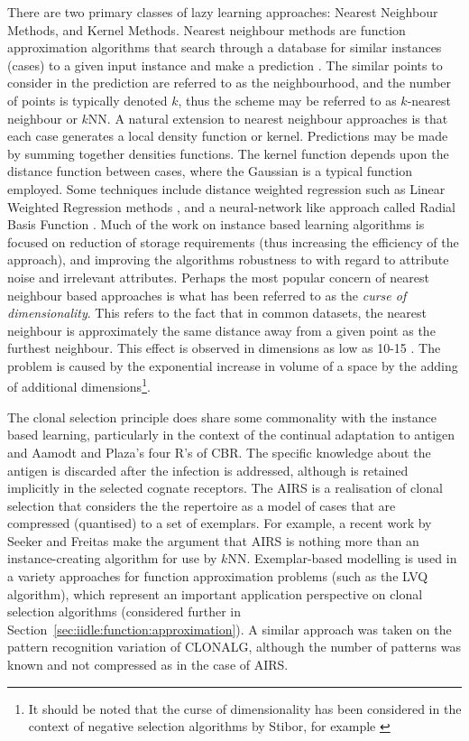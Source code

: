 There are two primary classes of lazy learning approaches: Nearest Neighbour Methods, and Kernel Methods. Nearest neighbour methods are function approximation algorithms that search through a database for similar instances (cases) to a given input instance and make a prediction \cite{Cover1967}.  The similar points to consider in the prediction are referred to as the neighbourhood, and the number of points is typically denoted $k$, thus the scheme may be referred to as $k$-nearest neighbour or $k$NN. A natural extension to nearest neighbour approaches is that each case generates a local density function or kernel. Predictions may be made by summing together densities functions. The kernel function depends upon the distance function between cases, where the Gaussian is a typical function employed. Some techniques include distance weighted regression such as Linear Weighted Regression methods \cite{Atkeson1997}, and a neural-network like approach called Radial Basis Function \cite{Broomhead1988, Buhmann2000, Powell1987}. Much of the work on instance based learning algorithms is focused on reduction of storage requirements (thus increasing the efficiency of the approach), and improving the algorithms robustness to with regard to attribute noise and irrelevant attributes. Perhaps the most popular concern of nearest neighbour based approaches is what has been referred to as the \emph{curse of dimensionality}. This refers to the fact that in common datasets, the nearest neighbour is approximately the same distance away from a given point as the furthest neighbour. This effect is observed in dimensions as low as 10-15 \cite{Beyer1998}. The problem is caused by the exponential increase in volume of a space by the adding of additional dimensions\footnote{It should be noted that the curse of dimensionality has been considered in the context of negative selection algorithms by Stibor, for example \cite{Stibor2006}}. 

The clonal selection principle does share some commonality with the instance based learning, particularly in the context of the continual adaptation to antigen and Aamodt and Plaza's four R's of CBR. The specific knowledge about the antigen is discarded after the infection is addressed, although is retained implicitly in the selected cognate receptors. The AIRS is a realisation of clonal selection that considers the the repertoire as a model of cases that are compressed (quantised) to a set of exemplars. For example, a recent work by Seeker and Freitas \cite{Seeker2007} make the argument that AIRS is nothing more than an instance-creating algorithm for use by $k$NN. Exemplar-based modelling is used in a variety approaches for function approximation problems (such as the LVQ algorithm), which represent an important application perspective on clonal selection algorithms (considered further in Section~\ref{sec:iidle:function:approximation}). A similar approach was taken on the pattern recognition variation of CLONALG, although the number of patterns was known and not compressed as in the case of AIRS. 



